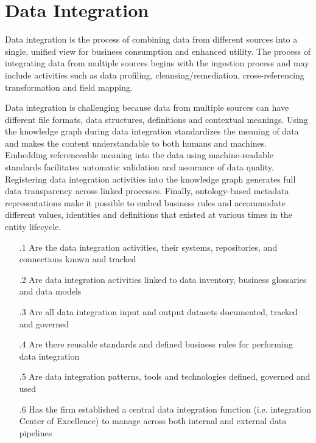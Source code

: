 \section{Data Integration}\label{sec:ekgmm-b-2-5} %

Data integration is the process of combining data from different sources into a single, unified view for
business consumption and enhanced utility.
The process of integrating data from multiple sources begins with the ingestion process and may include activities
such as data profiling, cleansing/remediation, cross-referencing transformation and field mapping.

\kgmmekgrationalesection

Data integration is challenging because data from multiple sources can have different file formats, data structures,
definitions and contextual meanings.
Using the knowledge graph during data integration standardizes the meaning of data and makes the content understandable
to both humans and machines.
Embedding referenceable meaning into the data using machine-readable standards facilitates automatic validation and
assurance of data quality.
Registering data integration activities into the knowledge graph generates full data transparency across
linked processes.
Finally, ontology-based metadata representations make it possible to embed business rules and accommodate
different values, identities and definitions that existed at various times in the entity lifecycle.

\kgmmcorequestionssection

\begin{itemize}[leftmargin=.5in,font=\bfseries]

  \item [\thesection.1] Are the data integration activities, their systems, repositories, and connections
                        known and tracked
  \item [\thesection.2] Are data integration activities linked to data inventory, business glossaries and data models
  \item [\thesection.3] Are all data integration input and output datasets documented, tracked and governed
  \item [\thesection.4] Are there reusable standards and defined business rules for performing data integration
  \item [\thesection.5] Are data integration patterns, tools and technologies defined, governed and used
  \item [\thesection.6] Has the firm established a central data integration function
                        (i.e. integration Center of Excellence) to manage  across both
                        internal and external data pipelines
\end{itemize}

